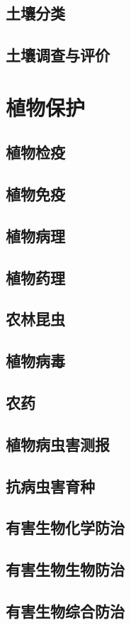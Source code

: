 \documentclass[UTF8]{../ApplicationUniverse}
\begin{document}
\section{土壤分类}
\section{土壤调查与评价}

\chapter{植物保护}
\section{植物检疫}
\section{植物免疫}
\section{植物病理}
\section{植物药理}
\section{农林昆虫}
\section{植物病毒}
\section{农药}
\section{植物病虫害测报}
\section{抗病虫害育种}
\section{有害生物化学防治}
\section{有害生物生物防治}
\section{有害生物综合防治}
\end{document}

